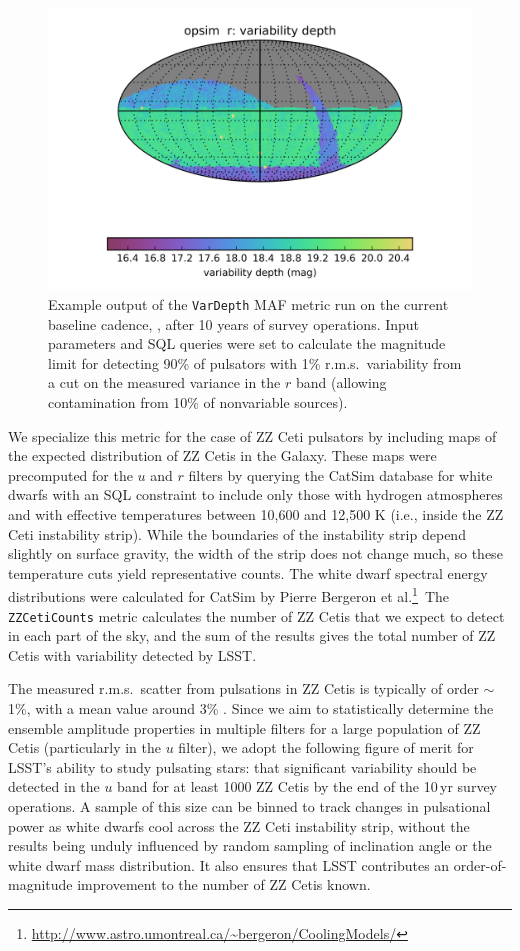 \begin{figure}
  \centering
  \includegraphics[width=0.76\columnwidth]{figs/vardepth.png}
  \caption{Example output of the {\tt VarDepth} MAF metric run on the
  current baseline cadence, , after 10 years of survey
  operations. Input parameters and SQL queries were set to calculate the
  magnitude limit for detecting 90\% of pulsators with 1\% r.m.s.\
  variability from a cut on the measured variance in the $r$ band
  (allowing contamination from 10\% of nonvariable sources).}
  \label{fig:vardepth}
\end{figure}


We specialize this metric for the case of ZZ Ceti pulsators by including
maps of the expected distribution of ZZ Cetis in the Galaxy. These maps
were precomputed for the $u$ and $r$ filters by querying the CatSim
database for white dwarfs with an SQL constraint to include only those
with hydrogen atmospheres and with effective temperatures between 10,600
and 12,500 K (i.e., inside the ZZ Ceti instability strip).  While the
boundaries of the instability strip depend slightly on surface gravity,
the width of the strip does not change much, so these temperature cuts
yield representative counts.  The white dwarf spectral energy
distributions were calculated for CatSim by Pierre Bergeron et
al.\footnote{\url{http://www.astro.umontreal.ca/~bergeron/CoolingModels/}}\
The {\tt ZZCetiCounts} metric calculates the number of ZZ Cetis that we
expect to detect in each part of the sky, and the sum of the results
gives the total number of ZZ Cetis with variability detected by LSST.

The measured r.m.s.\ scatter from pulsations in ZZ Cetis is typically of
order $\sim$1\%, with a mean value around 3\%
\citep{2006ApJ...640..956M}.  Since we aim to statistically determine
the ensemble amplitude properties in multiple filters for a large
population of ZZ Cetis (particularly in the $u$ filter), we adopt the
following figure of merit for LSST's ability to study pulsating stars:
that significant variability should be detected in the $u$ band for at
least 1000 ZZ Cetis by the end of
the 10\,yr survey operations.  A sample of this size can be binned to track
changes in pulsational power as white dwarfs cool across the ZZ Ceti
instability strip, without the results being unduly influenced by random
sampling of inclination angle or the white dwarf mass distribution. It also
ensures that LSST contributes an order-of-magnitude improvement to the
number of ZZ Cetis known.

